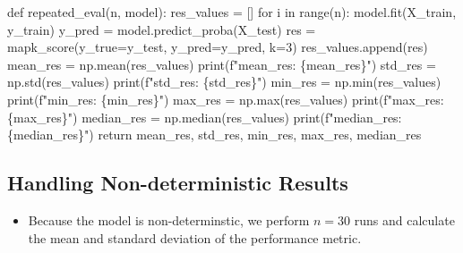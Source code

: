 \documentclass[
  letterpaper,
  DIV=11,
  numbers=noendperiod]{scrreprt}
\newenvironment{Shaded}{\begin{snugshade}}{\end{snugshade}}
\newcommand{\BuiltInTok}[1]{\textcolor[rgb]{0.00,0.23,0.31}{#1}}
\newcommand{\ControlFlowTok}[1]{\textcolor[rgb]{0.00,0.23,0.31}{#1}}
\newcommand{\DecValTok}[1]{\textcolor[rgb]{0.68,0.00,0.00}{#1}}
\newcommand{\KeywordTok}[1]{\textcolor[rgb]{0.00,0.23,0.31}{#1}}
\newcommand{\NormalTok}[1]{\textcolor[rgb]{0.00,0.23,0.31}{#1}}
\newcommand{\OperatorTok}[1]{\textcolor[rgb]{0.37,0.37,0.37}{#1}}
\newcommand{\SpecialCharTok}[1]{\textcolor[rgb]{0.37,0.37,0.37}{#1}}
\newcommand{\SpecialStringTok}[1]{\textcolor[rgb]{0.13,0.47,0.30}{#1}}
\providecommand{\tightlist}{%
  \setlength{\itemsep}{0pt}\setlength{\parskip}{0pt}}\usepackage{longtable,booktabs,array}
\begin{document}
\begin{Shaded}
\begin{Highlighting}[]
\KeywordTok{def}\NormalTok{ repeated\_eval(n, model):}
\NormalTok{    res\_values }\OperatorTok{=}\NormalTok{ []}
    \ControlFlowTok{for}\NormalTok{ i }\KeywordTok{in} \BuiltInTok{range}\NormalTok{(n):}
\NormalTok{        model.fit(X\_train, y\_train)}
\NormalTok{        y\_pred }\OperatorTok{=}\NormalTok{ model.predict\_proba(X\_test)}
\NormalTok{        res }\OperatorTok{=}\NormalTok{ mapk\_score(y\_true}\OperatorTok{=}\NormalTok{y\_test, y\_pred}\OperatorTok{=}\NormalTok{y\_pred, k}\OperatorTok{=}\DecValTok{3}\NormalTok{)}
\NormalTok{        res\_values.append(res)}
\NormalTok{    mean\_res }\OperatorTok{=}\NormalTok{ np.mean(res\_values)}
    \BuiltInTok{print}\NormalTok{(}\SpecialStringTok{f"mean\_res: }\SpecialCharTok{\{}\NormalTok{mean\_res}\SpecialCharTok{\}}\SpecialStringTok{"}\NormalTok{)}
\NormalTok{    std\_res }\OperatorTok{=}\NormalTok{ np.std(res\_values)}
    \BuiltInTok{print}\NormalTok{(}\SpecialStringTok{f"std\_res: }\SpecialCharTok{\{}\NormalTok{std\_res}\SpecialCharTok{\}}\SpecialStringTok{"}\NormalTok{)}
\NormalTok{    min\_res }\OperatorTok{=}\NormalTok{ np.}\BuiltInTok{min}\NormalTok{(res\_values)}
    \BuiltInTok{print}\NormalTok{(}\SpecialStringTok{f"min\_res: }\SpecialCharTok{\{}\NormalTok{min\_res}\SpecialCharTok{\}}\SpecialStringTok{"}\NormalTok{)}
\NormalTok{    max\_res }\OperatorTok{=}\NormalTok{ np.}\BuiltInTok{max}\NormalTok{(res\_values)}
    \BuiltInTok{print}\NormalTok{(}\SpecialStringTok{f"max\_res: }\SpecialCharTok{\{}\NormalTok{max\_res}\SpecialCharTok{\}}\SpecialStringTok{"}\NormalTok{)}
\NormalTok{    median\_res }\OperatorTok{=}\NormalTok{ np.median(res\_values)}
    \BuiltInTok{print}\NormalTok{(}\SpecialStringTok{f"median\_res: }\SpecialCharTok{\{}\NormalTok{median\_res}\SpecialCharTok{\}}\SpecialStringTok{"}\NormalTok{)}
    \ControlFlowTok{return}\NormalTok{ mean\_res, std\_res, min\_res, max\_res, median\_res}
\end{Highlighting}
\end{Shaded}

\hypertarget{handling-non-deterministic-results-2}{%
\subsection{Handling Non-deterministic
Results}\label{handling-non-deterministic-results-2}}

\begin{itemize}
\tightlist
\item
  Because the model is non-determinstic, we perform \(n=30\) runs and
  calculate the mean and standard deviation of the performance metric.
\end{itemize}
\end{document}
